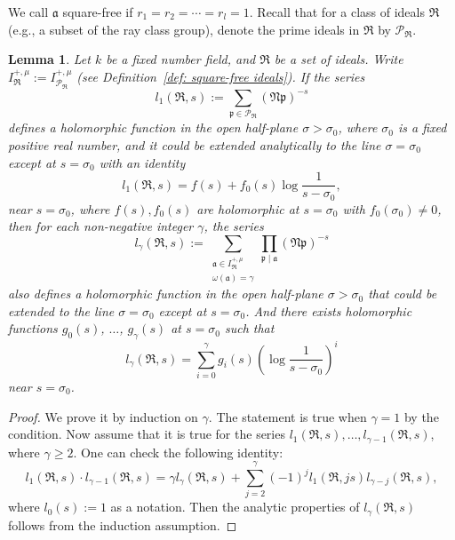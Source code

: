 \documentclass{amsart}
\numberwithin{equation}{section}
\theoremstyle{plain}
\newtheorem{lemma}[theorem]{Lemma}
\theoremstyle{definition}
\theoremstyle{remark}
\begin{document}
We call $\mathfrak{a}$ square-free if $r_1=r_2=\cdots=r_l=1$.
Recall that for a class of ideals $\mathfrak{R}$ (e.g., a subset of the ray class group), denote the prime ideals in $\mathfrak{R}$ by $\mathcal{P}_{\mathfrak{R}}$.
\begin{lemma}\label{lemma: l(r,s)}
	Let $k$ be a fixed number field, and $\mathfrak{R}$ be a set of ideals.
	Write $I^{+,\mu}_{\mathfrak{R}}:= I^{+,\mu}_{\mathcal{P}_{\mathfrak{R}}}$ (see Definition~\ref{def: square-free ideals}).
	If the series
	\begin{equation*}
		l_{1}(\mathfrak{R},s):=\sum_{\mathfrak{p}\in\mathcal{P}_{\mathfrak{R}}}(\mathfrak{N}\mathfrak{p})^{-s}
	\end{equation*}
	defines a holomorphic function in the open half-plane $\sigma>\sigma_0$, where $\sigma_0$ is a fixed positive real number,
	and it could be extended analytically to the line $\sigma=\sigma_0$ except at $s=\sigma_0$ with an identity
	\begin{equation*}
		l_1(\mathfrak{R},s)=f(s)+f_0(s)\log\frac{1}{s-\sigma_0},
	\end{equation*}
	near $s=\sigma_0$, where $f(s),f_0(s)$ are holomorphic at $s=\sigma_0$ with $f_0(\sigma_0)\neq0$,
	then for each non-negative integer $\gamma$, the series
	\begin{equation*}
		l_{\gamma}(\mathfrak{R},s):=
		\sum_{
			\substack{
				\mathfrak{a}\in I^{+,\mu}_{\mathfrak{R}}\\
				\omega(\mathfrak{a})=\gamma
			}
		}\prod_{\mathfrak{p}\mid\mathfrak{a}}(\mathfrak{N}\mathfrak{p})^{-s}
	\end{equation*}
	also defines a holomorphic function in the open half-plane $\sigma>\sigma_0$ that could be extended to the line $\sigma=\sigma_0$ except at $s=\sigma_0$.
	And there exists holomorphic functions $g_0(s)$, $\dots$, $g_{\gamma}(s)$ at $s=\sigma_0$ such that
	\begin{equation*}
		l_{\gamma}(\mathfrak{R},s)=\sum_{i=0}^{\gamma}g_i(s)(\log\frac{1}{s-\sigma_0})^i
	\end{equation*}
	near $s=\sigma_0$.
\end{lemma}
\begin{proof}
	We prove it by induction on $\gamma$.
	The statement is true when $\gamma=1$ by the condition.
	Now assume that it is true for the series $l_{1}(\mathfrak{R},s),\dots,l_{\gamma-1}(\mathfrak{R},s)$, where $\gamma\geq2$.
	One can check the following identity:
	\begin{equation*}
		l_1(\mathfrak{R},s)\cdot l_{\gamma-1}(\mathfrak{R},s)=\gamma l_{\gamma}(\mathfrak{R},s)+\sum_{j=2}^{\gamma}(-1)^{j}l_1(\mathfrak{R},js)l_{\gamma-j}(\mathfrak{R},s),
	\end{equation*}
	where $l_0(s):=1$ as a notation.
	Then the analytic properties of $l_{\gamma}(\mathfrak{R},s)$ follows from the induction assumption.
\end{proof}
\end{document}
